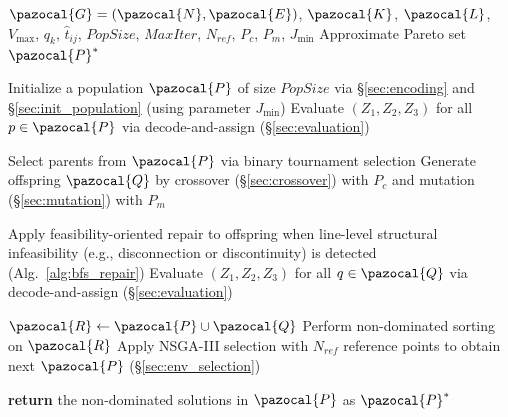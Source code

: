\documentclass[a4paper,fleqn]{cas-sc}
\begin{document}
\begin{algorithm}[htbp]
\small
\caption{NSGA-III based Adaptive PT Network Optimization}
\label{alg:NSGA3}
\begin{algorithmic}[1]
    \renewcommand{\algorithmicrequire}{\textbf{Input:}}
    \renewcommand{\algorithmicensure}{\textbf{Output:}}
    
    \REQUIRE $\pazocal{G}=(\pazocal{N}, \pazocal{E})$, $\pazocal{K}$, $\pazocal{L}$, $V_{\max}$, $q_k$, $\hat{t}_{ij}$, $\textit{PopSize}$, $\textit{MaxIter}$, $N_{\textit{ref}}$, $P_c$, $P_m$, $J_{\min}$
    \ENSURE Approximate Pareto set $\pazocal{P}^*$
    
    \STATE Initialize a population $\pazocal{P}$ of size $\textit{PopSize}$ via \S\ref{sec:encoding} and \S\ref{sec:init_population} (using parameter $J_\text{min}$) \label{line:initialization}
    \STATE Evaluate $(Z_1, Z_2, Z_3)$ for all $p \in \pazocal{P}$ via decode-and-assign (\S\ref{sec:evaluation}) \label{line:eval_init}
    
        \STATE Select parents from $\pazocal{P}$ via binary tournament selection \label{line:parent_selection}
        \STATE Generate offspring $\pazocal{Q}$ by crossover (\S\ref{sec:crossover}) with $P_c$ and mutation (\S\ref{sec:mutation}) with $P_m$ \label{line:variation}
        
        \STATE Apply feasibility-oriented repair to offspring when line-level structural infeasibility (e.g., disconnection or discontinuity) is detected (Alg.~\ref{alg:bfs_repair})
        \STATE Evaluate $(Z_1, Z_2, Z_3)$ for all $q \in \pazocal{Q}$ via decode-and-assign (\S\ref{sec:evaluation}) \label{line:evaluation}
        
        \STATE $\pazocal{R} \gets \pazocal{P} \cup \pazocal{Q}$
        \STATE Perform non-dominated sorting on $\pazocal{R}$ \label{line:nd_sort}
        \STATE Apply NSGA-III selection with $N_{\textit{ref}}$ reference points to obtain next $\pazocal{P}$ (\S\ref{sec:env_selection}) \label{line:env_select}
    \ENDFOR
    
    \STATE \textbf{return} the non-dominated solutions in $\pazocal{P}$ as $\pazocal{P}^*$
\end{algorithmic}
\end{algorithm}
\end{document}
